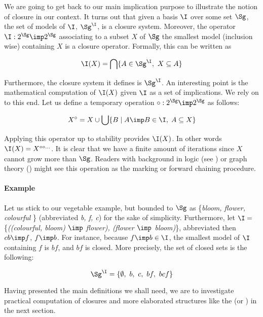 \vspace{1.2em}

We are going to get back to our main implication purpose to illustrate the 
notion of closure in our context. It turns out that given a basis
$\I$ over some set $\Sg$, the set of models of $\I$, $\Sg^{\I}$, is a closure 
system. Moreover, the operator $\I : 2^{\Sg} \imp 2^{\Sg}$ associating to a 
subset $X$ of $\Sg$ the smallest model (inclusion wise) containing $X$ is 
a closure operator. Formally, this can be written as 

\[ \I(X) = \bigcap \{A \in \Sg^{\I},\  X \subseteq A \} \]

\noindent Furthermore, the closure system it defines is 
$\Sg^{\I}$. An interesting point is the mathematical computation of 
$\I(X)$ given $\I$ as a set of implications. We rely on 
\cite{wild_implicational_1989, ganter_conceptual_2016} to this end. Let 
us define a temporary operation $\circ : 2^{\Sg} \imp 2^{\Sg}$ as follows:

\[ X^{\circ} = 
X \cup \bigcup \{ B \; | \; A \imp B \in \I, \; A \subseteq X \} \]

\noindent Applying this operator up to stability provides $\I(X)$. In other 
words $\I(X) = X^{\circ \circ \dots}$. It is clear that we have a finite amount of iterations since $X$ cannot grow more than $\Sg$. Readers with background in
logic (see \cite{boros_strong_2017}) or graph theory 
(\cite{berczi_directed_2017}) might see this operation as the marking or 
forward chaining procedure.

\vspace{1.2em}

\paragraph{Example} Let us stick to our vegetable example, but bounded to $\Sg$ as \{\textit{bloom, flower, colourful} \} (abbreviated \textit{b, f, c}) for the sake of simplicity. Furthermore, let $\I =$ \{\textit{((colourful, bloom) 
$\imp$ flower), (flower $\imp$ bloom)}\}, abbreviated then $cb \imp f$, $f 
\imp b$. For instance, because $f \imp b \in \I$, the smallest model of $\I$ 
containing $f$ is $bf$, and $bf$ is closed. More precisely, the set of closed
sets is the following:

	\[ \Sg^{\I} = \{ \emptyset, \ b, \ c, \ bf, \ bcf \} \]
	
\vspace{1.2em}

Having presented the main definitions we shall need, we are to investigate 
practical computation of closures and more elaborated structures like the 
 (or ) in the next section.



